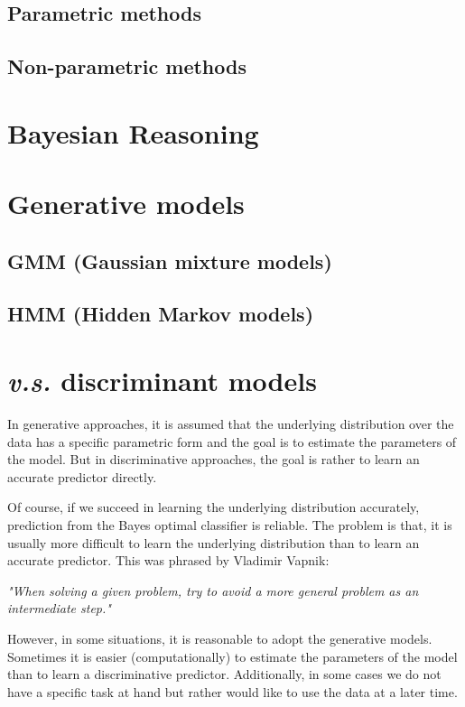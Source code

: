 \documentclass{article}
\begin{document}
	\subsection{Parametric methods}
	\subsection{Non-parametric methods}

\section{Bayesian Reasoning}

\section{Generative models}
	\subsection{GMM (Gaussian mixture models)}
	\subsection{HMM (Hidden Markov models)}

\section{\textit{v.s.} discriminant models}
	
	In generative approaches, it is assumed that the underlying distribution over the data has a specific parametric form and the goal is to estimate the parameters of the model. But in discriminative approaches, the goal is rather to learn an accurate predictor directly. 
	
	Of course, if we succeed in learning the underlying distribution accurately, prediction from the Bayes optimal classifier is reliable. The problem is that, it is usually more difficult to learn the underlying distribution than to learn an accurate predictor. This was phrased by Vladimir Vapnik:
	\begin{center}
	\textit{"When solving a given problem, try to avoid a more general problem as an intermediate step."}
	\end{center}

	However, in some situations, it is reasonable to adopt the generative models. Sometimes it is easier (computationally) to estimate the parameters of the model than to learn a discriminative predictor. Additionally, in some cases we do not have a specific task at hand but rather would like to use the data at a later time.
	
\end{document}
